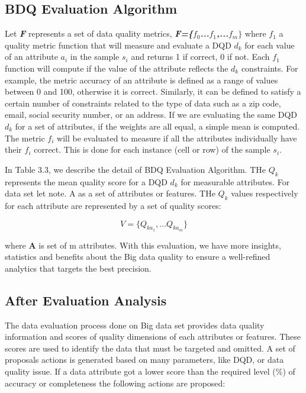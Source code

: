 \subsection{BDQ Evaluation Algorithm}

Let \textbf{\textit{F}} represents a set of data quality metrics, \textbf{\textit{F=\{$f_0$...$f_1$,...$f_m\}$}} 
where \textit{$f_1$} a quality metric function that will measure and evaluate a DQD \textbf{$d_k$}
for each value of an attribute $a_i$ in the sample $s_i$ and returns 1 if correct, 0 if not. 
Each $f_1$ function will compute if the value of the attribute reflects the $d_k$ constraints. 
For example, the metric accuracy of an attribute is defined as a range of values between 0 and 100,
otherwise it is correct. Similarly, it can be defined to satisfy a certain number of constraints
related to the type of data such as a zip code, email, social security number, or an address. 
If we are evaluating the same DQD $d_k$ for a set of attributes, if the weights are all equal, a simple mean 
is computed. The metric $f_i$ will be evaluated to measure if all the attributes individually 
have their $f_i$ correct. This is done for each instance (cell or row) of the sample $s_i$.

In Table 3.3, we describe the detail of BDQ Evaluation Algorithm. THe $Q_k$ represents the mean
quality score for a DQD $d_k$ for measurable attributes. For data set let note. 
A as a set of attributes or features. THe $Q_k$ values respectively for each attribute are represented
by a set of quality scores: 

\begin{equation*}
	V = \{Q_{ka_1},... Q_{ka_m} \}
\end{equation*}

where \textbf{A} is set of m attributes. With this evaluation, we have more insights, statistics and benefits 
about the Big data quality to ensure a well-refined analytics that targets the best precision.

\subsection{After Evaluation Analysis}

The data evaluation process done on Big data set provides
data quality information and scores of quality dimensions of
each attributes or features. These scores are used to identify
the data that must be targeted and omitted. A set of
proposals actions is generated based on many parameters,
like DQD, or data quality issue. If a data attribute got a
lower score than the required level (\%) of accuracy or
completeness the following actions are proposed:

